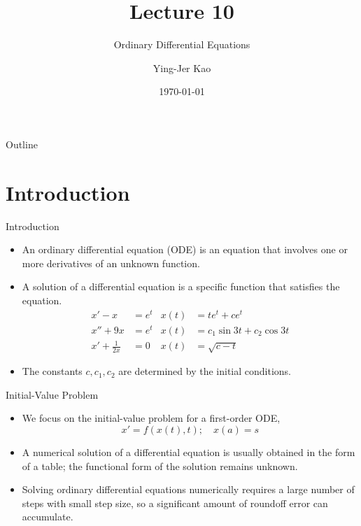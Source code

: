 \documentclass{beamer}
\title[Ordinary Differential Equations] %
{Lecture 10}
\subtitle
{Ordinary Differential Equations} %
\author[Ying-Jer Kao] %
{Ying-Jer Kao}
\institute[National Taiwan University] %
{
  Department of Physics\\
 National Taiwan University
  }
\date[Numerical Analysis and Programming] %
{\today}
\newcommand{\beforeverb}{\scriptsize}
\newcommand{\afterverb}{\normalsize}
\begin{document}
\begin{frame}
  \titlepage
\end{frame}

\begin{frame}{Outline}
  \tableofcontents
\end{frame}



\section[Introduction]{Introduction}
\begin{frame}{Introduction}
\begin{itemize}
\item An \alert{ordinary differential equation} (ODE) is an equation that involves one or more derivatives of an unknown function. 
\item A \alert{solution} of a differential equation is a specific function that satisfies the equation.
\begin{align*}
x'-x&=e^t &x(t)&=te^t + c e^t\\
x''+9x&=e^t&x(t)&=c_1\sin3t+c_2 \cos 3t\\
x'+\frac{1}{2x}&=0 &x(t)&=\sqrt{c-t}
\end{align*}
\item The constants $c, c_1, c_2$ are determined by the \alert{initial conditions}. 
 \end{itemize}
\end{frame}

\begin{frame}{Initial-Value Problem}
\begin{itemize}
\item We focus on the initial-value problem for a \alert{first-order} ODE, 
\[
x'=f(x(t),t); \quad x(a)=s
\]
\afterverb 
\item A numerical solution of a differential equation is usually obtained in the form of a \alert{table}; the functional form of the solution remains unknown.
\item Solving ordinary differential equations numerically requires a \alert{large number of steps} with \alert{small step size}, so a significant amount of \alert{roundoff error can accumulate}. 
\end{itemize}
\end{frame}
\end{document}
